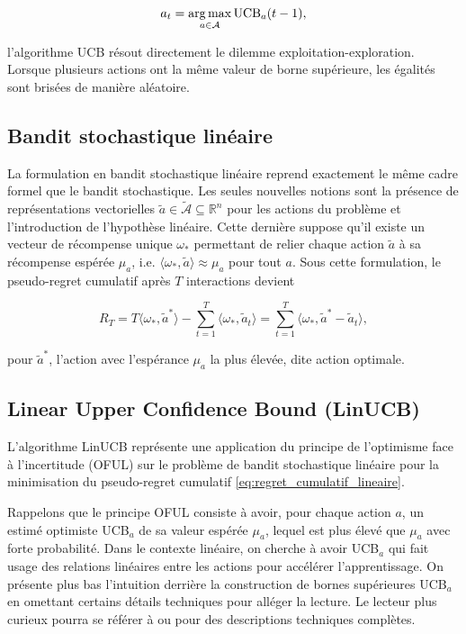\begin{equation*}
    a_t = \operatorname*{arg\,max}_{a \in \mathcal{A}} \text{UCB}_a(t-1),
    \label{eq:ucb_selection}
\end{equation*}

l'algorithme UCB résout directement le dilemme exploitation-exploration.
Lorsque plusieurs actions ont la même valeur de borne supérieure, 
les égalités sont brisées de manière aléatoire.

\subsection{Bandit stochastique linéaire}
\label{subsec:bandit_lineaire}

La formulation en bandit stochastique linéaire reprend exactement le même
cadre formel que le bandit stochastique.
Les seules nouvelles notions sont la présence de représentations vectorielles
$\tilde{a} \in \tilde{\mathcal{A}} \subseteq \mathbb{R}^n$
pour les actions du problème et l'introduction de l'hypothèse linéaire.
Cette dernière suppose qu'il existe un vecteur de récompense unique $\omega_*$
permettant de relier chaque action $\tilde{a}$ à sa récompense espérée $\mu_a$, i.e. 
$\langle \omega_*, \tilde{a}\rangle \approx \mu_a$ pour tout $a$.
Sous cette formulation, le pseudo-regret cumulatif après $T$ interactions
devient

\begin{equation}
    R_T = T \langle \omega_*, \tilde{a}^*\rangle -  \sum_{t=1}^T  \langle \omega_*,\tilde{a}_t\rangle =\sum_{t=1}^T  \langle \omega_*, \tilde{a}^* - \tilde{a}_t\rangle,
    \label{eq:regret_cumulatif_lineaire}
\end{equation}

pour $\tilde{a}^*$, l'action avec l'espérance $\mu_a$ la plus élevée, dite action optimale.

\subsection{Linear Upper Confidence Bound (LinUCB)}
\label{subsec:pr_linucb}

L'algorithme LinUCB \citep{chu2011contextual} représente une application 
du principe de l'optimisme face à l'incertitude (OFUL) sur le problème de bandit stochastique linéaire
pour la minimisation du pseudo-regret cumulatif \eqref{eq:regret_cumulatif_lineaire}.

Rappelons que le principe OFUL consiste à avoir, pour chaque action $a$, un estimé optimiste UCB$_a$
de sa valeur espérée $\mu_a$, lequel est plus élevé que $\mu_a$ avec forte probabilité.
Dans le contexte linéaire, on cherche à avoir UCB$_a$ qui fait usage des relations linéaires entre les 
actions pour accélérer l'apprentissage.
On présente plus bas l'intuition derrière la construction de bornes supérieures
UCB$_a$ en omettant certains détails techniques pour alléger la lecture.
Le lecteur plus curieux pourra se référer à \citet{chu2011contextual} ou \citet{abbasi2011improved}
pour des descriptions techniques complètes.


